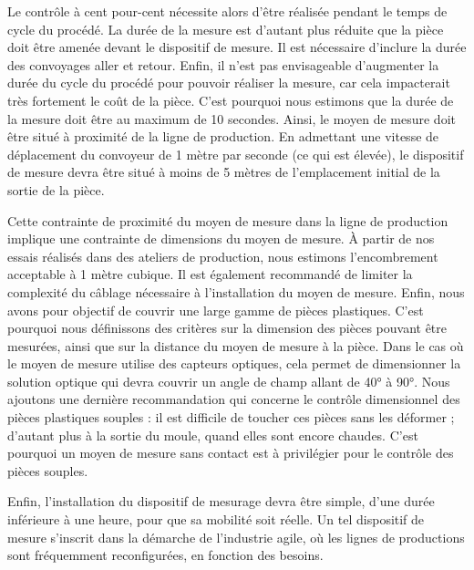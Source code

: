 Le contrôle à cent pour-cent nécessite alors d'être réalisée pendant le temps de cycle du procédé.
La durée de la mesure est d'autant plus réduite que la pièce doit être amenée devant le dispositif de mesure.
Il est nécessaire d'inclure la durée des convoyages aller et retour.
Enfin, il n'est pas envisageable d'augmenter la durée du cycle du procédé pour pouvoir réaliser la mesure, car cela impacterait très fortement le coût de la pièce.
C'est pourquoi nous estimons que la durée de la mesure doit être au maximum de 10 secondes.
%
Ainsi, le moyen de mesure doit être situé à proximité de la ligne de production.
En admettant une vitesse de déplacement du convoyeur de 1 mètre par seconde (ce qui est élevée), le dispositif de mesure devra être situé à moins de 5 mètres de l'emplacement initial de la sortie de la pièce.
%

Cette contrainte de proximité du moyen de mesure dans la ligne de production implique une contrainte de dimensions du moyen de mesure.
À partir de nos essais réalisés dans des ateliers de production, nous estimons l'encombrement acceptable à 1 mètre cubique.
Il est également recommandé de limiter la complexité du câblage nécessaire à l'installation du moyen de mesure.
%
Enfin, nous avons pour objectif de couvrir une large gamme de pièces plastiques.
C'est pourquoi nous définissons des critères sur la dimension des pièces pouvant être mesurées, ainsi que sur la distance du moyen de mesure à la pièce.
Dans le cas où le moyen de mesure utilise des capteurs optiques, cela permet de dimensionner la solution optique qui devra couvrir un angle de champ allant de 40° à 90°.
%
Nous ajoutons une dernière recommandation qui concerne le contrôle dimensionnel des pièces plastiques souples : il est difficile de toucher ces pièces sans les déformer ; d'autant plus à la sortie du moule, quand elles sont encore chaudes.
C'est pourquoi un moyen de mesure sans contact est à privilégier pour le contrôle des pièces souples.

Enfin, l'installation du dispositif de mesurage devra être simple, d'une durée inférieure à une heure, pour que sa mobilité soit réelle.
Un tel dispositif de mesure s'inscrit dans la démarche de l'industrie agile, où les lignes de productions sont fréquemment reconfigurées, en fonction des besoins.




